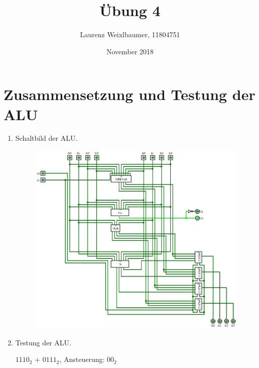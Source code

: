 \documentclass{article}
\title{Übung 4}
\author{Laurenz Weixlbaumer, 11804751}
\date{November 2018}
\begin{document}
\maketitle

\section{Zusammensetzung und Testung der ALU}

\begin{enumerate}[label=(\alph*)]

\item Schaltbild der ALU.

\begin{figure}[htp]
\begin{center}
\includegraphics[width=14cm]{alu_circuit.png}
\end{center}
\end{figure}

\item Testung der ALU.

\begin{description}

\item [$1110_2$ + $0111_2$, Ansteuerung: $00_2$]


\end{description}
\end{enumerate}
\end{document}
